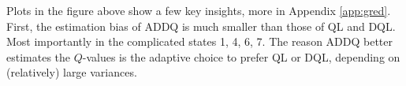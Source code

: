 \documentclass{article}
\theoremstyle{plain}
\theoremstyle{definition}
\theoremstyle{remark}
\begin{document}
Plots in the figure above show a few key insights, more in Appendix \ref{app:gred}. First, the estimation bias of ADDQ is much smaller than those of QL and DQL. Most importantly in the complicated states 1, 4, 6, 7. The reason ADDQ better estimates the $Q$-values is the adaptive choice to prefer QL or DQL, depending on (relatively) large variances.



\end{document}

